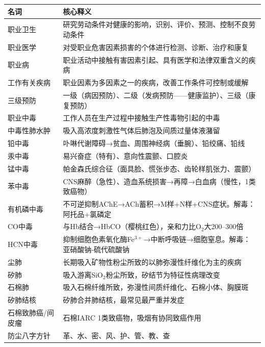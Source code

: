 \begin{table}[htbp]
\centering
\begin{tabularx}{\textwidth}{lX}
\hline
\textbf{名词} & \textbf{核心释义} \\
\hline
职业卫生 & 研究劳动条件对健康的影响，识别、评价、预测、控制不良劳动条件 \\
职业医学 & 对受职业危害因素损害的个体进行检测、诊断、治疗和康复 \\
职业病 & 职业活动中接触有害因素引起、具有医学和法律双重含义的疾病 \\
工作有关疾病 & 职业因素为多因素之一的疾病，改善工作条件可控制或缓解 \\
三级预防 & 一级（病因预防）、二级（发病预防——健康监护）、三级（康复预防）\\
职业中毒 & 工作人员在生产过程中接触生产性毒物引起的中毒 \\
中毒性肺水肿 & 吸入高浓度刺激性气体后肺泡及间质过量体液潴留 \\
铅中毒 & 卟啉代谢障碍→贫血、周围神经病（垂腕）、铅绞痛、铅线 \\
汞中毒 & 易兴奋症（特有）、意向性震颤、口腔炎 \\
锰中毒 & 帕金森氏综合征（面具脸、慌张步态、齿轮样肌张力、震颤）\\
苯中毒 & CNS麻醉（急性）、造血系统损害→再障→白血病（慢性，1类致癌物）\\
有机磷中毒 & 不可逆抑制AChE→ACh蓄积→M样+N样+CNS症状。解毒：阿托品+氯磷定 \\
CO中毒 & 与Hb结合→HbCO（樱桃红色），亲和力比O$_2$大200--300倍 \\
HCN中毒 & 抑制细胞色素氧化酶Fe$^{3+}$→中断呼吸链→细胞窒息。解毒：亚硝酸钠-硫代硫酸钠 \\
尘肺 & 长期吸入矿物性粉尘所致的以肺弥漫性纤维化为主的疾病 \\
矽肺 & 吸入游离SiO$_2$粉尘所致，矽结节为特征性病理改变 \\
石棉肺 & 吸入石棉纤维所致，弥漫性间质纤维化、石棉小体、胸膜斑 \\
矽肺结核 & 矽肺合并肺结核，最常见最严重并发症 \\
石棉致肺癌/间皮瘤 & 石棉IARC 1类致癌物，吸烟有协同致癌作用 \\
防尘八字方针 & 革、水、密、风、护、管、教、查 \\
\hline
\end{tabularx}
\end{table}

